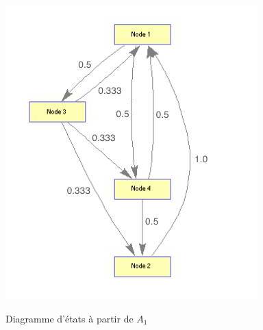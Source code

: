 \documentclass[a4paper,titlepage]{report}
\begin{document}
\begin{figure}[h]
	\center
	\includegraphics[scale=0.45]{../images/Q1.jpg}\label{fig:Q1}
	\caption{Diagramme d'états à partir de $A_1$}
\end{figure}
\end{document}
